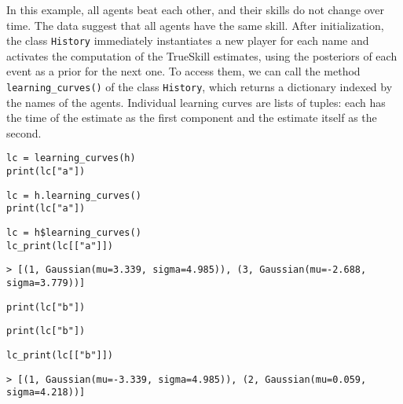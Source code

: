 \documentclass[article]{jss}
\begin{document}
In this example, all agents beat each other, and their skills do not change over time. 
The data suggest that all agents have the same skill. 
After initialization, the class \texttt{History} immediately instantiates a new player for each name and activates the computation of the TrueSkill estimates, using the posteriors of each event as a prior for the next one. 
To access them, we can call the method \texttt{learning\_curves()} of the class \texttt{History}, which returns a dictionary indexed by the names of the agents. 
Individual learning curves are lists of tuples: each has the time of the estimate as the first component and the estimate itself as the second. 
%
\begin{paracol}{3}
\begin{lstlisting}[backgroundcolor=\color{julia!60}, belowskip=-0.77 \baselineskip]
lc = learning_curves(h)
print(lc["a"])
\end{lstlisting}
  \switchcolumn
\begin{lstlisting}[backgroundcolor=\color{python!60}, belowskip=-0.77 \baselineskip]
lc = h.learning_curves()
print(lc["a"])
\end{lstlisting}
   \switchcolumn
\begin{lstlisting}[backgroundcolor=\color{r!50}, belowskip=-0.77 \baselineskip]
lc = h$learning_curves()
lc_print(lc[["a"]])
\end{lstlisting}
\end{paracol}
\begin{lstlisting}[backgroundcolor=\color{all}, belowskip=-0.77 \baselineskip]
> [(1, Gaussian(mu=3.339, sigma=4.985)), (3, Gaussian(mu=-2.688, sigma=3.779))]
\end{lstlisting}
\begin{paracol}{3}
\begin{lstlisting}[backgroundcolor=\color{julia!60}, belowskip=-0.77 \baselineskip]
print(lc["b"])
\end{lstlisting}
  \switchcolumn
\begin{lstlisting}[backgroundcolor=\color{python!60}, belowskip=-0.77 \baselineskip]
print(lc["b"])
\end{lstlisting}
   \switchcolumn
\begin{lstlisting}[backgroundcolor=\color{r!50}, belowskip=-0.77 \baselineskip]
lc_print(lc[["b"]])
\end{lstlisting}
\end{paracol}
\begin{lstlisting}[captionpos=b,backgroundcolor=\color{all},label=lst:trueskill, caption={Learning curves of players participating in a sequence of events.},belowskip=0cm]
> [(1, Gaussian(mu=-3.339, sigma=4.985)), (2, Gaussian(mu=0.059, sigma=4.218))]
\end{lstlisting}
\end{document}
